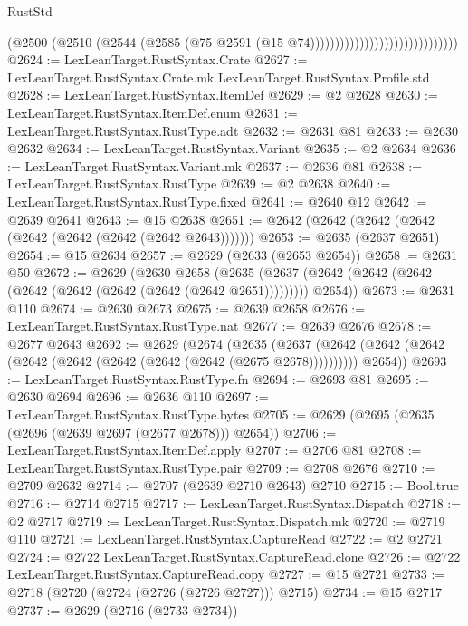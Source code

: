 \begin{lexlean}{RustStd}
\begin{coremodule}
                                                    (@2500
                                                      (@2510
                                                        (@2544
                                                          (@2585
                                                            (@75
                                                              @2591
                                                              (@15 @74))))))))))))))))))))))))))))))
@2624 := LexLeanTarget.RustSyntax.Crate
@2627 := LexLeanTarget.RustSyntax.Crate.mk LexLeanTarget.RustSyntax.Profile.std
@2628 := LexLeanTarget.RustSyntax.ItemDef
@2629 := @2 @2628
@2630 := LexLeanTarget.RustSyntax.ItemDef.enum
@2631 := LexLeanTarget.RustSyntax.RustType.adt
@2632 := @2631 @81
@2633 := @2630 @2632
@2634 := LexLeanTarget.RustSyntax.Variant
@2635 := @2 @2634
@2636 := LexLeanTarget.RustSyntax.Variant.mk
@2637 := @2636 @81
@2638 := LexLeanTarget.RustSyntax.RustType
@2639 := @2 @2638
@2640 := LexLeanTarget.RustSyntax.RustType.fixed
@2641 := @2640 @12
@2642 := @2639 @2641
@2643 := @15 @2638
@2651 := @2642 (@2642 (@2642 (@2642 (@2642 (@2642 (@2642 (@2642 @2643)))))))
@2653 := @2635 (@2637 @2651)
@2654 := @15 @2634
@2657 := @2629 (@2633 (@2653 @2654))
@2658 := @2631 @50
@2672 := @2629
    (@2630
      @2658
      (@2635 (@2637 (@2642 (@2642 (@2642 (@2642 (@2642 (@2642 (@2642 (@2642 @2651))))))))) @2654))
@2673 := @2631 @110
@2674 := @2630 @2673
@2675 := @2639 @2658
@2676 := LexLeanTarget.RustSyntax.RustType.nat
@2677 := @2639 @2676
@2678 := @2677 @2643
@2692 := @2629
    (@2674
      (@2635
        (@2637 (@2642 (@2642 (@2642 (@2642 (@2642 (@2642 (@2642 (@2642 (@2675 @2678))))))))))
        @2654))
@2693 := LexLeanTarget.RustSyntax.RustType.fn
@2694 := @2693 @81
@2695 := @2630 @2694
@2696 := @2636 @110
@2697 := LexLeanTarget.RustSyntax.RustType.bytes
@2705 := @2629 (@2695 (@2635 (@2696 (@2639 @2697 (@2677 @2678))) @2654))
@2706 := LexLeanTarget.RustSyntax.ItemDef.apply
@2707 := @2706 @81
@2708 := LexLeanTarget.RustSyntax.RustType.pair
@2709 := @2708 @2676
@2710 := @2709 @2632
@2714 := @2707 (@2639 @2710 @2643) @2710
@2715 := Bool.true
@2716 := @2714 @2715
@2717 := LexLeanTarget.RustSyntax.Dispatch
@2718 := @2 @2717
@2719 := LexLeanTarget.RustSyntax.Dispatch.mk
@2720 := @2719 @110
@2721 := LexLeanTarget.RustSyntax.CaptureRead
@2722 := @2 @2721
@2724 := @2722 LexLeanTarget.RustSyntax.CaptureRead.clone
@2726 := @2722 LexLeanTarget.RustSyntax.CaptureRead.copy
@2727 := @15 @2721
@2733 := @2718 (@2720 (@2724 (@2726 (@2726 @2727))) @2715)
@2734 := @15 @2717
@2737 := @2629 (@2716 (@2733 @2734))

\end{coremodule}
\end{lexlean}
